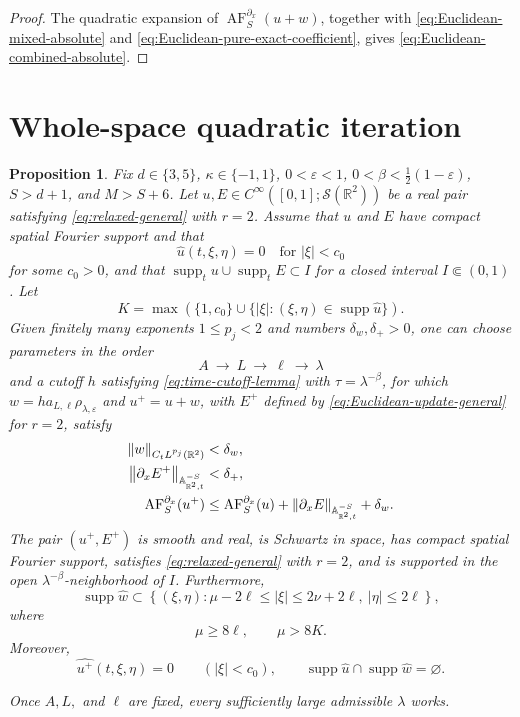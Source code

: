 \documentclass[12pt,reqno,letterpaper]{amsart}
\numberwithin{equation}{section}
\newtheorem{proposition}[theorem]{Proposition}
\theoremstyle{definition}
\newcommand{\R}{\mathbb R}
\newcommand{\A}{\mathbb A}
\newcommand{\eps}{\varepsilon}
\newcommand{\la}{\lambda}
\newcommand{\supp}{\operatorname{supp}}
\newcommand{\norm}[1]{\left\lVert #1\right\rVert}
\newcommand{\abs}[1]{\left\lvert #1\right\rvert}
\begin{document}
\begin{proof}
The quadratic expansion of $\operatorname{AF}^{\partial_x}_S(u+w)$, together
with \eqref{eq:Euclidean-mixed-absolute} and
\eqref{eq:Euclidean-pure-exact-coefficient}, gives
\eqref{eq:Euclidean-combined-absolute}.
\end{proof}

\section{Whole-space quadratic iteration}


\begin{proposition}\label{prop:Euclidean-onestep}
Fix $d\in\{3,5\}$, $\kappa\in\{-1,1\}$,
$0<\eps<1$, $0<\beta<\frac12(1-\eps)$, $S>d+1$, and $M>S+6$.
Let $u,E\in C^\infty([0,1];\mathcal S(\R^2))$ be a real pair satisfying
\eqref{eq:relaxed-general} with $r=2$.  Assume that $u$ and $E$ have compact spatial
Fourier support and that
\[
  \widehat u(t,\xi,\eta)=0\quad\text{for }\abs\xi<c_0
\]
for some $c_0>0$, and that
$\supp_tu\cup\supp_tE\subset I$ for a closed interval $I\Subset(0,1)$.
Let
\[
 K=\max\left(\{1,c_0\}\cup
 \{\abs\xi:(\xi,\eta)\in\supp\widehat u\}\right).
\]
Given finitely many exponents $1\leq p_j<2$ and numbers
$\delta_w,\delta_+>0$, one can choose parameters in the order
\[
 A\ \longrightarrow\ L\ \longrightarrow\ \ell\ \longrightarrow\ \la
\]
and a cutoff $h$ satisfying \eqref{eq:time-cutoff-lemma} with
$\tau=\la^{-\beta}$, for which $w=h a_{L,\ell}\rho_{\la,\eps}$ and
$u^+=u+w$, with $E^+$ defined by
\eqref{eq:Euclidean-update-general} for $r=2$, satisfy
\begin{align}
 \norm w_{C_tL^{p_j}(\R^2)}&<\delta_w,
 \label{eq:Euclidean-onestep-Lp}\\
 \norm{\partial_xE^+}_{\A^{-S}_{\R^2,t}}&<\delta_+,
 \notag\\
 \operatorname{AF}^{\partial_x}_S(u^+)
 &\leq\operatorname{AF}^{\partial_x}_S(u)
       +\norm{\partial_xE}_{\A^{-S}_{\R^2,t}}+\delta_w.
 \label{eq:Euclidean-onestep-absolute}
\end{align}
The pair $(u^+,E^+)$ is smooth and real, is Schwartz in space, has compact
spatial Fourier support, satisfies \eqref{eq:relaxed-general} with
$r=2$, and is
supported in the open $\la^{-\beta}$-neighborhood of $I$.  Furthermore,
\begin{equation}\label{eq:Euclidean-onestep-support}
 \supp\widehat w\subset
 \left\{(\xi,\eta):
   \mu-2\ell\leq\abs\xi\leq2\nu+2\ell,
   \ \abs\eta\leq2\ell\right\},
\end{equation}
where
\begin{equation}\label{eq:Euclidean-onestep-separation}
 \mu\geq8\ell,
 \qquad \mu>8K.
\end{equation}
Moreover,
\[
 \widehat{u^+}(t,\xi,\eta)=0\qquad(\abs\xi<c_0),
 \qquad
 \supp\widehat u\cap\supp\widehat w=\varnothing.
\]

Once $A,L,$ and $\ell$ are fixed, every sufficiently large admissible
$\la$ works.
\end{proposition}
\end{document}
